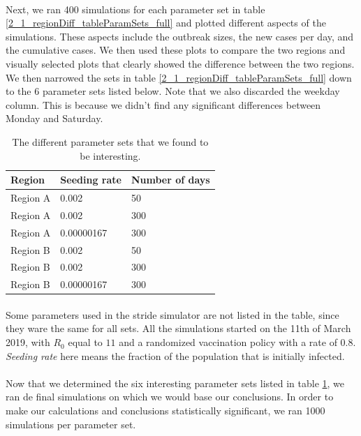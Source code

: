 \documentclass[runningheads]{llncs}
\begin{document}
\paragraph{} Next, we ran 400 simulations for each parameter set in table \ref{2_1_regionDiff_tableParamSets_full} and plotted different aspects of the simulations. These aspects include the outbreak sizes, the new cases per day, and the cumulative cases. We then used these plots to compare the two regions and visually selected plots that clearly showed the difference between the two regions. We then narrowed the sets in table \ref{2_1_regionDiff_tableParamSets_full} down to the 6 parameter sets listed below. Note that we also discarded the weekday column. This is because we didn't find any significant differences between Monday and Saturday.

\begin{table}[!h]
\centering
\begin{tabular}{|l|l|l|}
\hline
\textbf{Region} & \textbf{Seeding rate} & \textbf{Number of days} \\
\hline
Region A & 0.002      & 50 \\
\hline
Region A & 0.002      & 300 \\
\hline
Region A & 0.00000167 & 300 \\
\hline
Region B & 0.002      & 50 \\
\hline
Region B & 0.002      & 300 \\
\hline
Region B & 0.00000167 & 300 \\
\hline
\end{tabular}
\caption{The different parameter sets that we found to be interesting.}
\label{2_1_regionDiff_tableParamSets_filtered}
\end{table}


\paragraph{} Some parameters used in the stride simulator are not listed in the table, since they ware the same for all sets. All the simulations started on the 11th of March 2019, with $R_0$ equal to $11$ and a randomized vaccination policy with a rate of $0.8$. \textit{Seeding rate} here means the fraction of the population that is initially infected.

\paragraph{} Now that we determined the six interesting parameter sets listed in table \ref{2_1_regionDiff_tableParamSets_filtered}, we ran de final simulations on which we would base our conclusions. In order to make our calculations and conclusions statistically significant, we ran 1000 simulations per parameter set.
\end{document}
